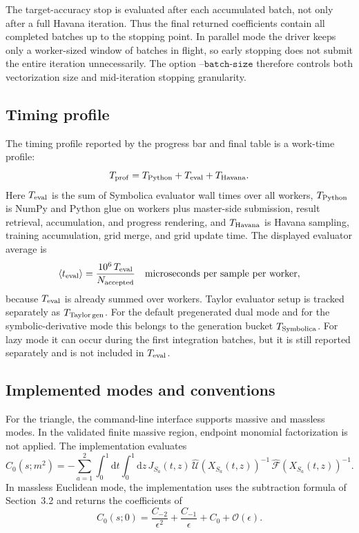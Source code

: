 \documentclass[11pt]{article}
\newcommand{\dd}{\mathrm d}
\newcommand{\hU}{\widehat{\mathcal U}}
\newcommand{\hF}{\widehat{\mathcal F}}
\begin{document}
The target-accuracy stop is evaluated after each accumulated batch, not only
after a full Havana iteration.  Thus the final returned coefficients contain
all completed batches up to the stopping point.  In parallel mode the driver
keeps only a worker-sized window of batches in flight, so early stopping does
not submit the entire iteration unnecessarily.  The option
\(\texttt{--batch-size}\) therefore controls both vectorization size and
mid-iteration stopping granularity.

\subsection{Timing profile}

The timing profile reported by the progress bar and final table is a work-time
profile:
\begin{equation}
  T_{\rm prof}
  =
  T_{\rm Python}
  +
  T_{\rm eval}
  +
  T_{\rm Havana}.
\end{equation}
Here \(T_{\rm eval}\) is the sum of Symbolica evaluator wall times over all
workers, \(T_{\rm Python}\) is NumPy and Python glue on workers plus
master-side submission, result retrieval, accumulation, and progress rendering,
and \(T_{\rm Havana}\) is Havana sampling, training accumulation, grid merge,
and grid update time.  The displayed evaluator average is
\begin{equation}
  \langle t_{\rm eval}\rangle
  =
  \frac{10^6\,T_{\rm eval}}{N_{\rm accepted}}
  \quad
  \text{microseconds per sample per worker},
\end{equation}
because \(T_{\rm eval}\) is already summed over workers.
Taylor evaluator setup is tracked separately as \(T_{\rm Taylor\,gen}\).  For
the default pregenerated dual mode and for the symbolic-derivative mode this
belongs to the generation bucket \(T_{\rm Symbolica}\).  For lazy mode it can
occur during the first integration batches, but it is still reported separately
and is not included in \(T_{\rm eval}\).

\subsection{Implemented modes and conventions}

For the triangle, the command-line interface supports massive and massless
modes.  In the validated finite massive region, endpoint monomial
factorization is not applied.  The implementation evaluates
\begin{equation}
  C_0(s;m^2)
  =
  -
  \sum_{a=1}^{2}
  \int_0^1\dd t
  \int_0^1\dd z\,
  J_{S_a}(t,z)\,
  \hU(X_{S_a}(t,z))^{-1}\,
  \hF(X_{S_a}(t,z))^{-1}.
\end{equation}
In massless Euclidean mode, the implementation uses the subtraction formula of
Section~3.2 and returns the coefficients of
\begin{equation}
  C_0(s;0)
  =
  \frac{C_{-2}}{\epsilon^2}
  +
  \frac{C_{-1}}{\epsilon}
  +
  C_0
  +
  \mathcal O(\epsilon).
\end{equation}
\end{document}
